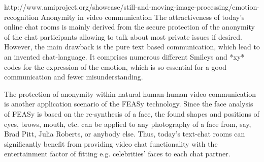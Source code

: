 http://www.amiproject.org/showcase/still-and-moving-image-processing/emotion-recognition
Anonymity in video communication
The attractiveness of today's online chat rooms is mainly derived from the secure protection of the anonymity of the chat participants allowing to talk about most private issues if desired. However, the main drawback is the pure text based communication, which lead to an invented chat-language. It comprises numerous different Smileys and *xy* codes for the expression of the emotion, which is so essential for a good communication and fewer misunderstanding.

The protection of anonymity within natural human-human video communication is another application scenario of the FEASy technology. Since the face analysis of FEASy is based on the re-synthesis of a face, the found shapes and positions of eyes, brows, mouth, etc. can be applied to any photography of a face from, say, Brad Pitt, Julia Roberts, or anybody else. Thus, today's text-chat rooms can significantly benefit from providing video chat functionality with the entertainment factor of fitting e.g. celebrities' faces to each chat partner.
